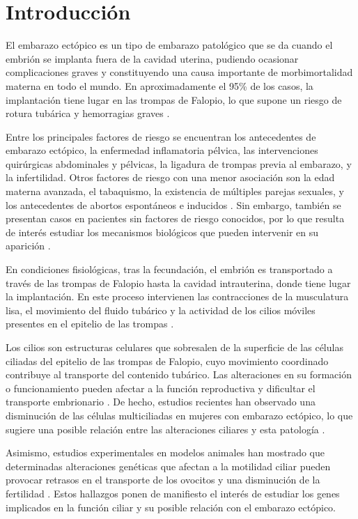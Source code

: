 \section{Introducción}

El embarazo ectópico es un tipo de embarazo patológico que se da cuando el embrión se implanta fuera de la cavidad uterina, pudiendo ocasionar complicaciones graves y constituyendo una causa importante de morbimortalidad materna en todo el mundo. En aproximadamente el 95\% de los casos, la implantación tiene lugar en las trompas de Falopio, lo que supone un riesgo de rotura tubárica y hemorragias graves \cite{Mullany2023, Papageorgiou2025}.

Entre los principales factores de riesgo se encuentran los antecedentes de embarazo ectópico, la enfermedad inflamatoria pélvica, las intervenciones quirúrgicas abdominales y pélvicas, la ligadura de trompas previa al embarazo, y la infertilidad. Otros factores de riesgo con una menor asociación son la edad materna avanzada, el tabaquismo, la existencia de múltiples parejas sexuales, y los antecedentes de abortos espontáneos e inducidos \cite{Brim2025}. Sin embargo, también se presentan casos en pacientes sin factores de riesgo conocidos, por lo que resulta de interés estudiar los mecanismos biológicos que pueden intervenir en su aparición \cite{Mullany2023}.

En condiciones fisiológicas, tras la fecundación, el embrión es transportado a través de las trompas de Falopio hasta la cavidad intrauterina, donde tiene lugar la implantación. En este proceso intervienen las contracciones de la musculatura lisa, el movimiento del fluido tubárico y la actividad de los cilios móviles presentes en el epitelio de las trompas \cite{Wloga2024}. 

Los cilios son estructuras celulares que sobresalen de la superficie de las células ciliadas del epitelio de las trompas de Falopio, cuyo movimiento coordinado contribuye al transporte del contenido tubárico. Las alteraciones en su formación o funcionamiento pueden afectar a la función reproductiva y dificultar el transporte embrionario \cite{Wloga2024}. De hecho, estudios recientes han observado una disminución de las células multiciliadas en mujeres con embarazo ectópico, lo que sugiere una posible relación entre  las alteraciones ciliares y esta patología \cite{Jiang2022}.

Asimismo, estudios experimentales en modelos animales han mostrado que determinadas alteraciones genéticas que afectan a la motilidad ciliar pueden provocar retrasos en el transporte de los ovocitos y una disminución de la fertilidad \cite{Scully2025}. Estos hallazgos ponen de manifiesto el interés de estudiar los genes implicados en la función ciliar y su posible relación con el embarazo ectópico.

